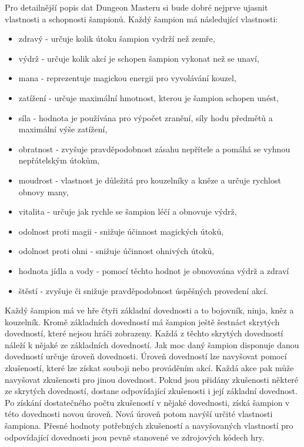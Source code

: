 Pro detailnější popis dat Dungeon Masteru si bude dobré nejprve ujasnit vlastnosti a schopnosti šampionů.
Každý šampion má následující vlastnosti:
\begin{itemize}
\item zdravý - určuje kolik útoku šampion vydrží než zemře,
\item výdrž - určuje kolik akcí je schopen šampion vykonat než se unaví, 
\item mana - reprezentuje magickou energii pro vyvolávání kouzel, 
\item zatížení - určuje maximální hmotnost, kterou je šampion schopen unést,
\item síla - hodnota je používána pro výpočet zranění, síly hodu předmětů a maximální výše zatížení,
\item obratnost - zvyšuje pravděpodobnost zásahu nepřítele a pomáhá se vyhnou nepřátelským útokům,
\item moudrost - vlastnost je důležitá pro kouzelníky a kněze a určuje rychlost obnovy many,
\item vitalita - určuje jak rychle se šampion léčí a obnovuje výdrž, 
\item odolnost proti magii - snižuje účinnost magických útoků,
\item odolnost proti ohni - snižuje účinnost ohnivých útoků,
\item hodnota jídla a vody - pomocí těchto hodnot je obnovována výdrž a zdraví
\item štěstí - zvyšuje či snižuje pravděpodobnost úspěšných provedení akcí.
\end{itemize}

Každý šampion má ve hře čtyři základní dovednosti a to bojovník, ninja, kněz a kouzelník.
Kromě základních dovedností má šampion ještě šestnáct skrytých dovedností, které nejsou hráči zobrazeny.
Každá z těchto skrytých dovedností náleží k nějaké ze základních dovedností.
Jak moc daný šampion disponuje danou dovedností určuje úroveň dovednosti. 
Úroveň dovedností lze navyšovat pomocí zkušeností, které lze získat souboji nebo prováděním akcí. Každá
akce pak může navyšovat zkušenosti pro jinou dovednost. Pokud jsou přidány zkušenosti některé ze skrytých
dovedností, dostane odpovídající zkušenosti i její základní dovednost. Po získání dostatečného
počtu zkušeností v nějaké dovednosti, získá šampion v této dovednosti novou úroveň. Nová úroveň potom
navýší určité vlastnosti šampiona. Přesné hodnoty potřebných zkušeností a navyšovaných vlastností pro 
odpovídající dovednosti jsou pevně stanovené ve zdrojových kódech hry.

